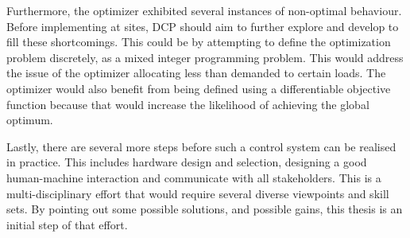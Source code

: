 Furthermore, the optimizer exhibited several instances of non-optimal behaviour. Before implementing at sites, DCP should aim to further explore and develop to fill these shortcomings. This could be by attempting to define the optimization problem discretely, as a mixed integer programming problem. This would address the issue of the optimizer allocating less than demanded to certain loads. The optimizer would also benefit from being defined using a differentiable objective function because that would increase the likelihood of achieving the global optimum. 

Lastly, there are several more steps before such a control system can be realised in practice. This includes hardware design and selection, designing a good human-machine interaction and communicate with all stakeholders. This is a multi-disciplinary effort that would require several diverse viewpoints and skill sets. By pointing out some possible solutions, and possible gains, this thesis is an initial step of that effort.